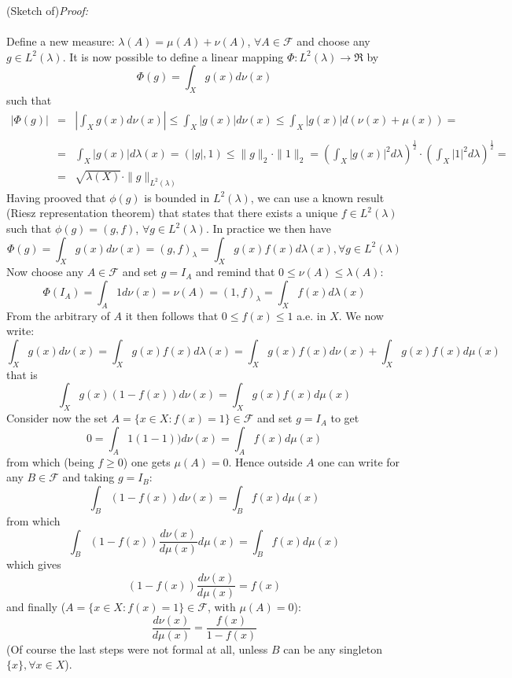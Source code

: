 \documentclass[a4paper,10pt]{report}
\theoremstyle{plain}
\theoremstyle{definition}
\newcommand\be{\begin{eqnarray}}    %
\newcommand\ee{\end{eqnarray}}
\newcommand{\PROOF} {{\emph{Proof: \\ \\}}}
\newcommand{\FF} {\mathcal{F} }
\begin{document}
(Sketch of)\PROOF 
Define a new measure: $\lambda(A)=\mu(A)+\nu(A)$, $\forall A\in\FF$ and choose any $g\in L^2(\lambda)$. It is now possible to define a linear mapping $\Phi:L^2(\lambda) \rightarrow \Re$ by
\[
\Phi(g)=\int_X g(x)d\nu(x)
\]
such that
\be
|\Phi(g)|&=&\left| \int_X g(x)d\nu(x) \right|\leq \int_X |g(x)|d\nu(x)\leq\int_X |g(x)|d(\nu(x)+\mu(x))=\\ \\
&=&\int_X |g(x)|d\lambda(x)=(|g|,1)\leq \|g\|_2 \cdot \|1\|_2=\left(\int_X |g(x)|^2d\lambda\right)^{\frac{1}{2}}\cdot \left(\int_X |1|^2d\lambda\right)^{\frac{1}{2}}=\\
&=&\sqrt{\lambda(X)}\cdot \|g\|_{L^2(\lambda)}
\ee
Having prooved that $\phi(g)$ is bounded in $L^2(\lambda)$, we can use a known result (Riesz representation theorem) that states that there exists a unique $f\in L^2(\lambda)$ such that $\phi(g)=(g,f)$, $\forall g\in L^2(\lambda)$. In practice we then have
\[
\Phi(g)=\int_X g(x)d\nu(x)=(g,f)_\lambda=\int_X g(x)f(x)d\lambda(x), \forall g\in L^2(\lambda)
\]
Now choose any $A\in \FF$ and set $g=I_A$ and remind that $0\leq \nu(A) \leq \lambda(A)$:
\[
\Phi(I_A)=\int_A 1d\nu(x)=\nu(A)=(1,f)_\lambda=\int_X f(x)d\lambda(x)
\]
From the arbitrary of $A$ it then follows that $0\leq f(x) \leq 1$ a.e. in $X$.
We now write:
\[
\int_X g(x)d\nu(x)=\int_X g(x)f(x)d\lambda(x)=\int_X g(x)f(x)d\nu(x)+\int_X g(x)f(x)d\mu(x)
\]
that is
\[
\int_X g(x)(1-f(x))d\nu(x)=\int_X g(x)f(x)d\mu(x)
\]
Consider now the set $A=\{x\in X: f(x)=1\}\in \FF$ and set $g=I_A$ to get
\[
0=\int_A 1(1-1))d\nu(x)=\int_A f(x)d\mu(x)
\]
from which (being $f\ge 0$) one gets $\mu(A)=0$. Hence outside $A$ one can write for any $B\in \FF$ and taking $g=I_B$:
\[
\int_B (1-f(x))d\nu(x)=\int_B f(x)d\mu(x)
\]
from which
\[
\int_B (1-f(x))\frac{d\nu(x)}{d\mu(x)}d\mu(x)=\int_B f(x)d\mu(x)
\]
which gives
\[
(1-f(x))\frac{d\nu(x)}{d\mu(x)}=f(x)
\]
and finally ($A=\{x\in X: f(x)=1\}\in \FF$, with $\mu(A)=0$):
\[
\frac{d\nu(x)}{d\mu(x)}=\frac{f(x)}{1-f(x)}
\]
(Of course the last steps were not formal at all, unless $B$ can be any singleton $\{x\}, \forall x\in X$).
\end{document}
